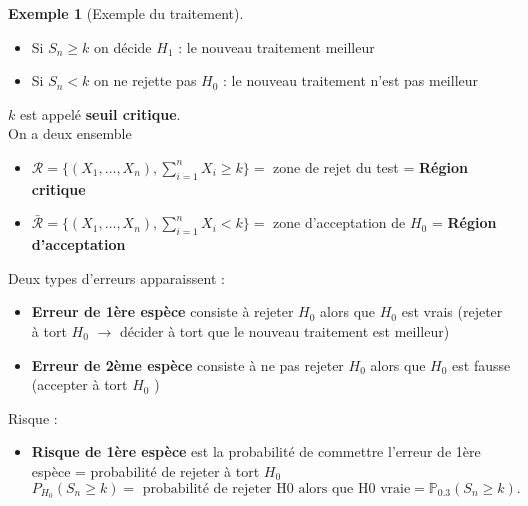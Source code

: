 \documentclass{article}
\theoremstyle{plain}%
\theoremstyle{definition}
\newtheorem{exmp}{Exemple}[section]
\theoremstyle{remark}
\begin{document}
\begin{exmp}[Exemple du traitement]
\begin{itemize}
        \item Si $ S_n \geq k$ on décide $ H_1 $ : le nouveau traitement meilleur
        \item Si $ S_n < k $ on ne rejette pas $ H_0 $ : le nouveau traitement n'est pas meilleur
    \end{itemize}
    $ k $ est appelé \textbf{seuil critique}. \\
    On a deux ensemble \begin{itemize}
        \item $ \mathcal{R} = \{ (X_1, \dots, X_n), \sum_{i=1}^{n}X_i \geq k\} = $ zone de rejet du test = \textbf{Région critique}
        \item $ \bar{\mathcal{R}} = \{(X_1, \dots, X_n), \sum_{i=1}^{n} X_i < k\} =$ zone d'acceptation de $ H_0 $ = \textbf{Région d'acceptation} 
    \end{itemize}
    Deux types d'erreurs apparaissent :\begin{itemize}
        \item \textbf{Erreur de 1ère espèce} consiste à rejeter $ H_0 $ alors que $ H_0 $ est vrais (rejeter à tort $ H_0 $ $\rightarrow$ décider à tort que le nouveau traitement est meilleur)
        \item \textbf{Erreur de 2ème espèce} consiste à ne pas rejeter $ H_0 $ alors que $ H_0 $ est fausse (accepter à tort $ H_0 $ )
    \end{itemize}
    Risque : \begin{itemize}
        \item \textbf{Risque de 1ère espèce }est la probabilité de commettre l'erreur de 1ère espèce = probabilité de rejeter à tort $ H_0 $ 
        \[
            P_{H_0}(S_n \geq k) = \text{ probabilité de rejeter H0 alors que H0 vraie} = \mathbb{P}_{0.3} (S_n \geq k)
        .\]
        

\end{itemize}
\end{exmp}
\end{document}
